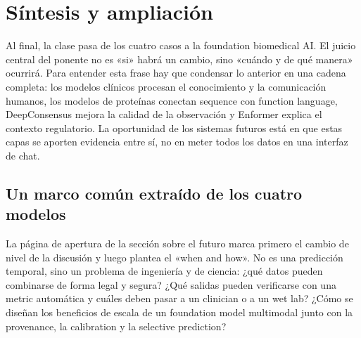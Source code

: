 \section{Síntesis y ampliación}

Al final, la clase pasa de los cuatro casos a la foundation biomedical AI. El juicio central del ponente no es «si» habrá un cambio, sino «cuándo y de qué manera» ocurrirá. Para entender esta frase hay que condensar lo anterior en una cadena completa: los modelos clínicos procesan el conocimiento y la comunicación humanos, los modelos de proteínas conectan sequence con function language, DeepConsensus mejora la calidad de la observación y Enformer explica el contexto regulatorio. La oportunidad de los sistemas futuros está en que estas capas se aporten evidencia entre sí, no en meter todos los datos en una interfaz de chat.

\subsection{Un marco común extraído de los cuatro modelos}

La página de apertura de la sección sobre el futuro marca primero el cambio de nivel de la discusión y luego plantea el «when and how». No es una predicción temporal, sino un problema de ingeniería y de ciencia: ¿qué datos pueden combinarse de forma legal y segura? ¿Qué salidas pueden verificarse con una metric automática y cuáles deben pasar a un clinician o a un wet lab? ¿Cómo se diseñan los beneficios de escala de un foundation model multimodal junto con la provenance, la calibration y la selective prediction?



